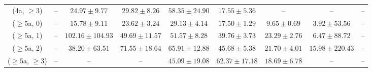\begin{table}[h!]
{\begin{tabular}{ccccccccc}
	(4a, $\ge3$) & -- & $24.97\pm 9.77$ & $29.82\pm 8.26$ & $58.35\pm 24.90$ & $17.55\pm 5.36$ & -- & -- & -- \\[0.5ex] 
	($\ge5$a, 0) & -- & $15.78\pm 9.11$ & $23.62\pm 3.24$ & $29.13\pm 4.14$ & $17.50\pm 1.29$ & $9.65\pm 0.69$ & $3.92\pm 53.56$ & -- \\[0.5ex] 
	($\ge5$a, 1) & -- & $102.16\pm 104.93$ & $49.69\pm 11.57$ & $51.57\pm 8.28$ & $39.76\pm 3.73$ & $23.29\pm 2.76$ & $6.47\pm 88.72$ & -- \\[0.5ex] 
	($\ge5$a, 2) & -- & $38.20\pm 63.51$ & $71.55\pm 18.64$ & $65.91\pm 12.88$ & $45.68\pm 5.38$ & $21.70\pm 4.01$ & $15.98\pm 220.43$ & -- \\[0.5ex] 
	($\ge5$a, $\ge3$) & -- & -- & -- & $45.09\pm 19.08$ & $62.37\pm 17.18$ & $18.69\pm 6.78$ & -- & -- \\[0.5ex] 
	\hline
	\hline
\end{tabular}}
\end{table}
